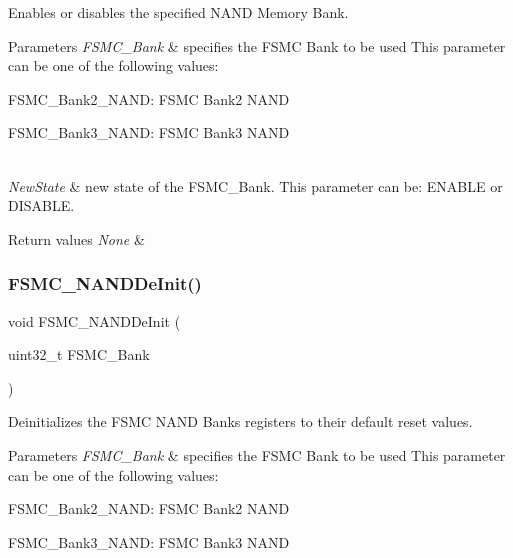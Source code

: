 Enables or disables the specified N\+A\+ND Memory Bank. 


\begin{DoxyParams}{Parameters}
{\em F\+S\+M\+C\+\_\+\+Bank} & specifies the F\+S\+MC Bank to be used This parameter can be one of the following values\+: \begin{DoxyItemize}
\item F\+S\+M\+C\+\_\+\+Bank2\+\_\+\+N\+A\+ND\+: F\+S\+MC Bank2 N\+A\+ND \item F\+S\+M\+C\+\_\+\+Bank3\+\_\+\+N\+A\+ND\+: F\+S\+MC Bank3 N\+A\+ND \end{DoxyItemize}
\\
\hline
{\em New\+State} & new state of the F\+S\+M\+C\+\_\+\+Bank. This parameter can be\+: E\+N\+A\+B\+LE or D\+I\+S\+A\+B\+LE. \\
\hline
\end{DoxyParams}

\begin{DoxyRetVals}{Return values}
{\em None} & \\
\hline
\end{DoxyRetVals}
\mbox{\label{group___f_s_m_c___exported___functions_gafb749503293474a68555961bd8f120e1}} 
\subsubsection{\texorpdfstring{FSMC\_NANDDeInit()}{FSMC\_NANDDeInit()}}
{\footnotesize\ttfamily void F\+S\+M\+C\+\_\+\+N\+A\+N\+D\+De\+Init (\begin{DoxyParamCaption}\item[{uint32\+\_\+t}]{F\+S\+M\+C\+\_\+\+Bank }\end{DoxyParamCaption})}



Deinitializes the F\+S\+MC N\+A\+ND Banks registers to their default reset values. 


\begin{DoxyParams}{Parameters}
{\em F\+S\+M\+C\+\_\+\+Bank} & specifies the F\+S\+MC Bank to be used This parameter can be one of the following values\+: \begin{DoxyItemize}
\item F\+S\+M\+C\+\_\+\+Bank2\+\_\+\+N\+A\+ND\+: F\+S\+MC Bank2 N\+A\+ND \item F\+S\+M\+C\+\_\+\+Bank3\+\_\+\+N\+A\+ND\+: F\+S\+MC Bank3 N\+A\+ND \end{DoxyItemize}
\\
\hline
\end{DoxyParams}

